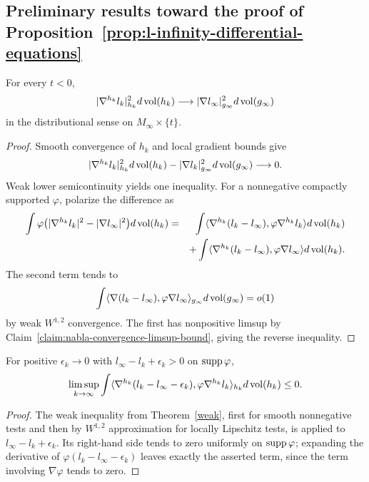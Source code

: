 \subsection{Preliminary results toward the proof of
Proposition~{\ref{prop:l-infinity-differential-equations}}}\label{sect9.2.3}

\begin{lemma}\label{lem:gradient-convergence-distributions}
\label{nablaconv}

For every $t<0$,
\[
 |\nabla^{h_k}l_k|_{h_k}^2d\operatorname{vol}(h_k)
 \longrightarrow |\nabla l_\infty|_{g_\infty}^2d\operatorname{vol}(g_\infty)
\]
in the distributional sense on $M_\infty\times\{t\}$.
\end{lemma}
\begin{proof}
\sketch Smooth convergence of $h_k$ and local gradient bounds give
\begin{equation}\label{firstdist}
 |\nabla^{h_k}l_k|_{h_k}^2d\operatorname{vol}(h_k)
 -|\nabla l_k|_{g_\infty}^2d\operatorname{vol}(g_\infty)\longrightarrow0.
\end{equation}
Weak lower semicontinuity yields one inequality. For a nonnegative
compactly supported $\varphi$, polarize the difference as
\begin{eqnarray}\label{11}
\int\varphi\bigl(|\nabla^{h_k}l_k|^2-|\nabla l_\infty|^2\bigr)d\operatorname{vol}(h_k)
&=&\int\langle\nabla^{h_k}(l_k-l_\infty),
\varphi\nabla^{h_k}l_k\rangle d\operatorname{vol}(h_k)\nonumber\\
&&+\int\langle\nabla^{h_k}(l_k-l_\infty),
\varphi\nabla l_\infty\rangle d\operatorname{vol}(h_k).
\end{eqnarray}
The second term tends to
\begin{equation}\label{12}
 \int\langle\nabla(l_k-l_\infty),
 \varphi\nabla l_\infty\rangle_{g_\infty}d\operatorname{vol}(g_\infty)=o(1)
\end{equation}
by weak $W^{1,2}$ convergence. The first has nonpositive limsup by
Claim~\ref{claim:nabla-convergence-limsup-bound}, giving the reverse
inequality.
\end{proof}

\begin{claim}\label{claim:nabla-convergence-limsup-bound}
For positive $\epsilon_k\to0$ with
$l_\infty-l_k+\epsilon_k>0$ on $\operatorname{supp}\varphi$,
\[
 \limsup_{k\to\infty}\int
 \langle\nabla^{h_k}(l_k-l_\infty-\epsilon_k),
 \varphi\nabla^{h_k}l_k\rangle_{h_k}d\operatorname{vol}(h_k)\leq0.
\]
\end{claim}
\begin{proof}
\sketch The weak inequality from Theorem~\ref{weak}, first for
smooth nonnegative tests and then by $W^{1,2}$ approximation for
locally Lipschitz tests, is applied to
$l_\infty-l_k+\epsilon_k$. Its right-hand side tends to zero
uniformly on $\operatorname{supp}\varphi$; expanding the derivative of
$\varphi(l_k-l_\infty-\epsilon_k)$ leaves exactly the asserted term,
since the term involving $\nabla\varphi$ tends to zero.
\end{proof}

